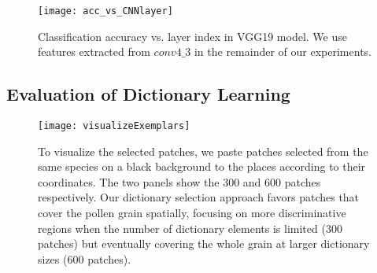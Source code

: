 \documentclass[10pt,twocolumn,letterpaper]{article}
\begin{document}
%


%

\begin{figure}[t]
\centering
   \texttt{[image: acc\_vs\_CNNlayer]}
\vspace{-0.5mm}
   \caption{Classification accuracy vs. layer index in VGG19 model. We use
   features extracted from $conv4\_3$ in the remainder of our experiments.}
\label{fig:acc_vs_CNNlayer}
\vspace{-3mm}
\end{figure}


\subsection{Evaluation of Dictionary Learning}

\begin{figure}[t]
\centering
   \texttt{[image: visualizeExemplars]}
\vspace{-1mm}
   \caption{To visualize the selected patches, we paste patches selected from
   the same species on a black background to the places according to their
   coordinates.  The two panels show the 300 and 600 patches respectively.
   Our dictionary selection approach favors patches that cover the pollen grain
   spatially, focusing on more discriminative regions when the number of
   dictionary elements is limited (300 patches) but eventually covering the
   whole grain at larger dictionary sizes (600 patches).
   }
\label{fig:visualizeExemplars}
\vspace{-3mm}
\end{figure}
\end{document}
